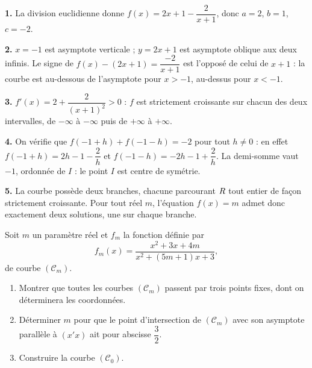 \begin{corrige}
\textbf{1.} La division euclidienne donne $f(x) = 2x+1-\dfrac{2}{x+1}$, donc
$a=2$, $b=1$, $c=-2$.

\textbf{2.} $x = -1$ est asymptote verticale ; $y = 2x+1$ est asymptote
oblique aux deux infinis. Le signe de $f(x)-(2x+1) = \dfrac{-2}{x+1}$ est
l'opposé de celui de $x+1$ : la courbe est au-dessous de l'asymptote pour
$x > -1$, au-dessus pour $x < -1$.

\textbf{3.} $f'(x) = 2 + \dfrac{2}{(x+1)^{2}} > 0$ : $f$ est strictement
croissante sur chacun des deux intervalles, de $-\infty$ à $-\infty$ puis de
$+\infty$ à $+\infty$.

\textbf{4.} On vérifie que $f(-1+h) + f(-1-h) = -2$ pour tout $h \neq 0$ :
en effet $f(-1+h) = 2h-1-\dfrac{2}{h}$ et $f(-1-h) = -2h-1+\dfrac{2}{h}$. La
demi-somme vaut $-1$, ordonnée de $I$ : le point $I$ est centre de symétrie.

\textbf{5.} La courbe possède deux branches, chacune parcourant $R$ tout
entier de façon strictement croissante. Pour tout réel $m$, l'équation
$f(x)=m$ admet donc exactement deux solutions, une sur chaque branche.
\end{corrige}

\begin{concours}
Soit $m$ un paramètre réel et $f_{m}$ la fonction définie par
\[
  f_{m}(x) = \frac{x^{2}+3x+4m}{x^{2}+(5m+1)x+3},
\]
de courbe $(\mathscr{C}_{m})$.

\begin{enumerate}[label=\textbf{\arabic*.}, leftmargin=*, itemsep=0.25em]
  \item Montrer que toutes les courbes $(\mathscr{C}_{m})$ passent par trois
        points fixes, dont on déterminera les coordonnées.
  \item Déterminer $m$ pour que le point d'intersection de $(\mathscr{C}_{m})$
        avec son asymptote parallèle à $(x'x)$ ait pour abscisse
        $\dfrac{3}{2}$.
  \item Construire la courbe $(\mathscr{C}_{0})$.
\end{enumerate}
\end{concours}

